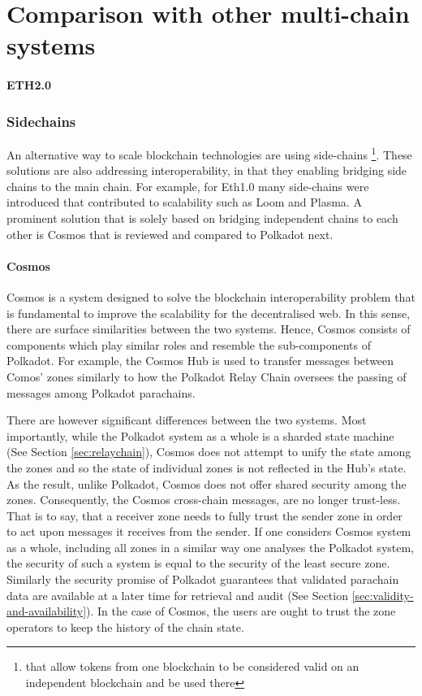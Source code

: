 \section{Comparison with other multi-chain systems}\label{sec:comparison}
\paragraph{ETH2.0}


\subsubsection*{Sidechains}
An alternative way to scale blockchain technologies are using side-chains \footnote{that allow tokens from one blockchain to be considered valid on an independent blockchain and be used there}. These solutions are also addressing interoperability, in that they enabling bridging side chains to the main chain. For example, for Eth1.0 many side-chains were introduced that contributed to scalability such as Loom \cite{} and Plasma.
A prominent solution that is solely based on bridging independent chains to each other is Cosmos \cite{} that is reviewed and compared to Polkadot next.

\paragraph{Cosmos}

Cosmos is a system designed to solve the blockchain interoperability problem that is fundamental to improve the scalability for the decentralised web. In this sense, there are surface similarities between the two systems. Hence, Cosmos consists of components which play similar roles and resemble the sub-components of Polkadot. For example, the Cosmos Hub is used to transfer messages between Comos' zones similarly to how the Polkadot Relay Chain oversees the passing of messages among Polkadot parachains.

There are however significant differences between the two systems. Most importantly, while the Polkadot system as a whole is a sharded state machine (See Section \ref{sec:relaychain}), Cosmos does not attempt to unify the state among the zones and so the state of individual zones is not reflected in the Hub's state. As the result, unlike Polkadot, Cosmos does not offer shared security among the zones. Consequently, the Cosmos cross-chain messages, are no longer trust-less. That is to say, that a receiver zone needs to fully trust the sender zone in order to act upon messages it receives from the sender. If one considers Cosmos system as a whole, including all zones in a similar way one analyses the Polkadot system, the security of such a system is equal to the security of the least secure zone. Similarly the security promise of Polkadot guarantees that validated parachain data are available at a later time for retrieval and audit (See Section \ref{sec:validity-and-availability}). In the case of Cosmos, the users are ought to trust the zone operators to keep the history of the chain state.

